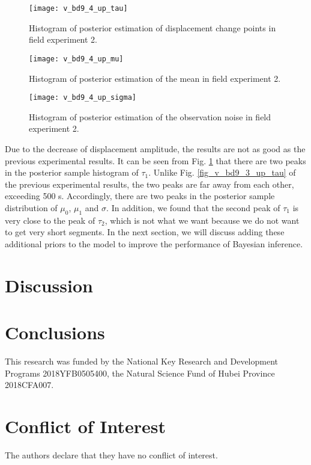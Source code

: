 \documentclass{svjour3}                     %
\begin{document}
\begin{figure}[htbp]
	\centering
	\texttt{[image: v\_bd9\_4\_up\_tau]}
	\caption{Histogram of posterior estimation of displacement change points in field experiment 2.}
	\label{fig_v_bd9_4_up_tau}
\end{figure} 
\begin{figure}[htbp]
	\centering
	\texttt{[image: v\_bd9\_4\_up\_mu]}
	\caption{Histogram of posterior estimation of the mean in field experiment 2.}
	\label{fig_v_bd9_4_up_mu}
\end{figure} 
\begin{figure}[htbp]
	\centering
	\texttt{[image: v\_bd9\_4\_up\_sigma]}
	\caption{Histogram of posterior estimation of the observation noise in field experiment 2.}
	\label{fig_v_bd9_4_up_sigma}
\end{figure}
Due to the decrease of displacement amplitude, the results are not as good as the previous experimental results. 
It can be seen from Fig. \ref{fig_v_bd9_4_up_tau} that there are two peaks in the posterior sample histogram of $\tau_1$. Unlike Fig. \ref{fig_v_bd9_3_up_tau} of the previous experimental results, the two peaks are far away from each other, exceeding 500 s. Accordingly, there are two peaks in the posterior sample distribution of $\mu_0$, $\mu_1$ and $\sigma$. In addition, we found that the second peak of $\tau_1$ is very close to the peak of $\tau_2$, which is not what we want because we do not want to get very short segments. In the next section, we will discuss adding these additional priors to the model to improve the performance of Bayesian inference.
\section{Discussion}
\label{disc}

\section{Conclusions}
\label{concl}

\begin{acknowledgements}
This research was funded by the National Key Research and Development Programs 2018YFB0505400, the Natural Science Fund of Hubei Province 2018CFA007.
\end{acknowledgements}

%
\section*{Conflict of Interest}
The authors declare that they have no conflict of interest.
\end{document}
